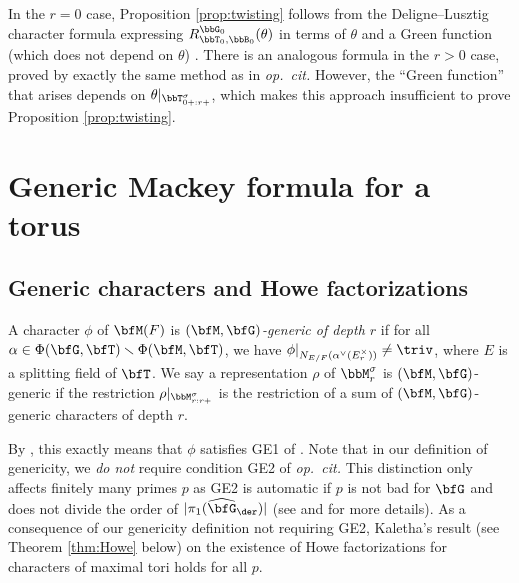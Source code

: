 \begin{remark}\label{rem:green insufficient}
  In the $r=0$ case, Proposition \ref{prop:twisting} follows from the Deligne--Lusztig character formula expressing $R_{\bbT_0,\bbB_0}^{\bbG_0}(\theta)$ in terms of $\theta$ and a Green function (which does not depend on $\theta$) \cite[Theorem 4.2]{DL76}. There is an analogous formula in the $r>0$ case, proved by exactly the same method as in \textit{op.\ cit.} However, the ``Green function'' that arises depends on $\theta|_{\bbT_{0+:r+}^\sigma}$, which makes this approach insufficient to prove Proposition \ref{prop:twisting}.
\end{remark}

\section{Generic Mackey formula for a torus}\label{sec:generic mackey}

\subsection{Generic characters and Howe factorizations}\label{subsec:generic characters}

\begin{definition}
  A character $\phi$ of $\bfM(F)$ is \textit{$(\bfM,\bfG)$-generic of depth $r$} if for all $\alpha \in \Phi(\bfG,\bfT) \smallsetminus \Phi(\bfM,\bfT)$, we have $\phi|_{N_{E/F}(\alpha^\vee(E_r^\times))} \neq \triv$, where $E$ is a splitting field of $\bfT$. We say a representation $\rho$ of $\bbM_r^\sigma$ is $(\bfM,\bfG)$-generic if the restriction $\rho|_{\bbM_{r:r+}^\sigma}$ is the restriction of a sum of $(\bfM,\bfG)$-generic characters of depth $r$.
\end{definition}

By \cite[Lemma 3.6.8]{Kal19}, this exactly means that $\phi$ satisfies GE1 of \cite[\S8]{Yu01}. Note that in our definition of genericity, we \textit{do not} require condition GE2 of \textit{op.\ cit.} This distinction only affects finitely many primes $p$ as GE2 is automatic if $p$ is not bad for $\bfG$ and does not divide the order of $|\pi_1(\widehat \bfG_{\der})|$ (see \cite[Remark 3.4]{CO21} and \cite[\S4]{Kaletha} for more details). As a consequence of our genericity definition not requiring GE2, Kaletha's result (see Theorem \ref{thm:Howe} below) on the existence of Howe factorizations for characters of maximal tori holds for all $p$.

